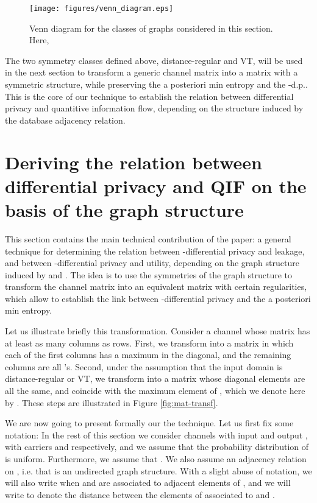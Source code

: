 \documentclass{llncs}
\begin{document}
\begin{figure}[t]\centering
		\texttt{[image: figures/venn\_diagram.eps]}\caption{Venn diagram for the classes of graphs considered in this section. Here, }\label{fig:venn}\end{figure}

The  two symmetry classes defined above, distance-regular and VT,  will be used in the next section to transform a generic channel matrix into a matrix with a symmetric structure, while preserving the a posteriori min entropy and the -d.p.. This is the core of our technique to establish the relation between differential privacy and quantitive information flow, depending on the structure induced by the database adjacency relation. 


\section{Deriving the relation between differential privacy and QIF on the basis of the graph structure}

This section contains  the main technical contribution of the paper: a general technique for determining the relation  between -differential privacy and leakage, and between  -differential privacy and utility, depending on the graph structure induced by  and . 
The idea is to use the symmetries of the graph structure to  transform the channel matrix into an equivalent  matrix with certain regularities, which allow to establish the link between -differential privacy and  the a posteriori min entropy. 

Let us illustrate briefly this transformation. Consider a channel whose matrix  has at least as many columns as rows.   First, we transform  into a matrix  in which each of the first  columns has a maximum  in the diagonal, and the remaining columns are all 's. 
Second, under the assumption that the input domain  is distance-regular or VT, we transform  into a matrix  whose diagonal elements are all the same, and coincide with the maximum element of , which we  denote here by . 
These steps are illustrated in Figure \ref{fig:mat-transf}.

We are now going to present formally our the technique. Let us first fix some notation: In the rest of this section  we consider channels with input   and output  , with carriers  and  respectively, and we assume that the probability distribution of  is uniform. Furthermore, we assume that .
We also assume  an adjacency relation  on  , i.e.  that  is an undirected  graph structure. With a slight abuse of notation, we will also write  when  and  are associated to adjacent elements of , and we will write  to denote the distance between the elements of  associated to  and . 
\end{document}
